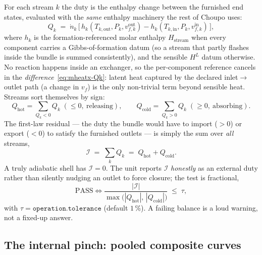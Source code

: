 \documentclass[11pt,a4paper]{article}
\begin{document}
For each stream $k$ the duty is the enthalpy change between the furnished
end states, evaluated with the \emph{same} enthalpy machinery the rest
of Choupo uses:
\begin{equation}
   Q_k \;=\; \dot n_k\,\bigl[\,h_k(T_{k,\text{out}}, P_k, v_{f,k}^{\text{out}})
                          - h_k(T_{k,\text{in}},  P_k, v_{f,k}^{\text{in}})\,\bigr],
   \label{eq:mheatx-Qk}
\end{equation}
where $h_k$ is the formation-referenced molar enthalpy
$H_{\text{stream}}$ when every component carries a Gibbs-of-formation
datum (so a stream that partly flashes inside the bundle is summed
consistently), and the sensible $H^L$ datum otherwise.  No reaction
happens inside an exchanger, so the per-component reference cancels in
the \emph{difference}~\eqref{eq:mheatx-Qk}: latent heat captured by the
declared inlet$\to$outlet path (a change in $v_f$) is the only
non-trivial term beyond sensible heat.  Streams sort themselves by sign:
\begin{equation}
   Q_{\text{hot}} = \!\!\sum_{Q_k < 0}\!\! Q_k \;(\le 0,\ \text{releasing}),
   \qquad
   Q_{\text{cold}} = \!\!\sum_{Q_k > 0}\!\! Q_k \;(\ge 0,\ \text{absorbing}).
\end{equation}
The first-law residual --- the duty the bundle would have to import
($>0$) or export ($<0$) to satisfy the furnished outlets --- is simply
the sum over \emph{all} streams,
\begin{equation}
   \mathcal I \;=\; \sum_k Q_k \;=\; Q_{\text{hot}} + Q_{\text{cold}}.
   \label{eq:mheatx-imbalance}
\end{equation}
A truly adiabatic shell has $\mathcal I = 0$.  The unit reports $\mathcal
I$ \emph{honestly} as an external duty rather than silently nudging an
outlet to force closure; the test is fractional,
\begin{equation}
   \text{PASS} \iff
   \frac{|\mathcal I|}
        {\max\!\bigl(|Q_{\text{hot}}|,\,|Q_{\text{cold}}|\bigr)}
   \;\le\; \tau,
\end{equation}
with $\tau = \texttt{operation.tolerance}$ (default $1\,\%$).  A failing
balance is a loud warning, not a fixed-up answer.

\subsection{The internal pinch: pooled composite curves}
\end{document}
